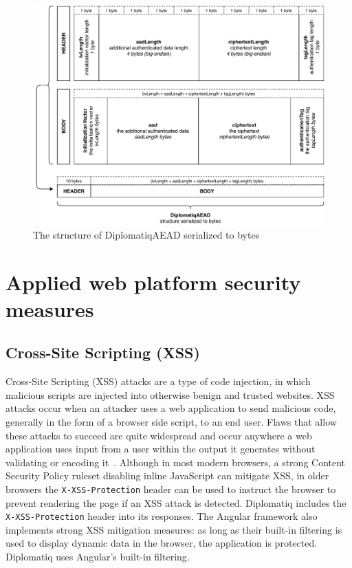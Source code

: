 \begin{figure}[!htb]
    \includegraphics[width=\textwidth]{figures/aead.pdf}
    \caption{The structure of DiplomatiqAEAD serialized to bytes}
    \label{fig:aead}
\end{figure}

\section{Applied web platform security measures}

\subsection{Cross-Site Scripting (XSS)}

Cross-Site Scripting (XSS) attacks are a type of code injection, in which malicious scripts are injected into otherwise benign and trusted websites. XSS attacks occur when an attacker uses a web application to send malicious code, generally in the form of a browser side script, to an end user. Flaws that allow these attacks to succeed are quite widespread and occur anywhere a web application uses input from a user within the output it generates without validating or encoding it~\cite{owasp-xss}. Although in most modern browsers, a strong Content Security Policy ruleset disabling inline JavaScript can mitigate XSS, in older browsers the \lstinline{X-XSS-Protection} header can be used to instruct the browser to prevent rendering the page if an XSS attack is detected. Diplomatiq includes the \lstinline{X-XSS-Protection} header into its responses. The Angular framework also implements strong XSS mitigation measures: as long as their built-in filtering is used to display dynamic data in the browser, the application is protected. Diplomatiq uses Angular's built-in filtering.

